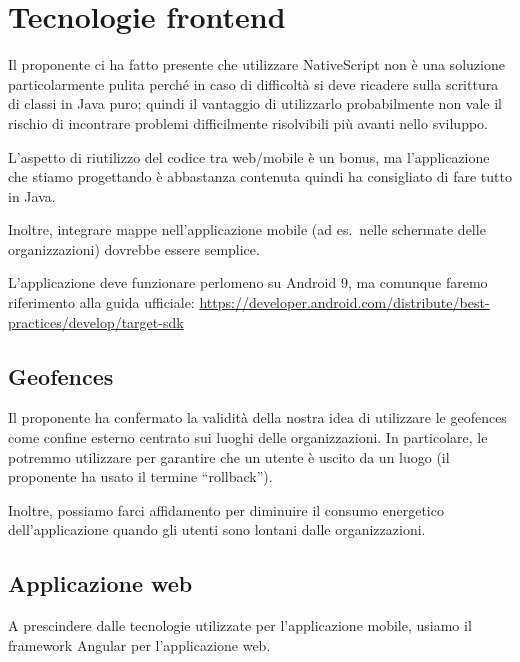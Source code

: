 \documentclass{article}
\begin{document}

\section{Tecnologie frontend}%
\label{sec:tecnologie_frontend}

Il proponente ci ha fatto presente che utilizzare NativeScript non è una soluzione particolarmente pulita perché in caso di difficoltà si deve ricadere sulla scrittura di classi in Java puro;
quindi il vantaggio di utilizzarlo probabilmente non vale il rischio di incontrare problemi difficilmente risolvibili più avanti nello sviluppo.

L'aspetto di riutilizzo del codice tra web/mobile è un bonus, ma l'applicazione che stiamo progettando è abbastanza contenuta quindi ha consigliato di fare tutto in Java.

Inoltre, integrare mappe nell'applicazione mobile (ad es.\ nelle schermate delle organizzazioni) dovrebbe essere semplice.

L'applicazione deve funzionare perlomeno su Android 9, ma comunque faremo riferimento alla guida ufficiale: \href{https://developer.android.com/distribute/best-practices/develop/target-sdk}{https://developer.android.com/distribute/best-practices/develop/target-sdk}

\subsection{Geofences}%
\label{sub:geofences}

Il proponente ha confermato la validità della nostra idea di utilizzare le geofences come confine esterno centrato sui luoghi delle organizzazioni.
In particolare, le potremmo utilizzare per garantire che un utente è uscito da un luogo (il proponente ha usato il termine ``rollback'').

Inoltre, possiamo farci affidamento per diminuire il consumo energetico dell'applicazione quando gli utenti sono lontani dalle organizzazioni.


\subsection{Applicazione web}%
\label{sub:applicazione_web}

A prescindere dalle tecnologie utilizzate per l'applicazione mobile, usiamo il framework Angular per l'applicazione web.
\end{document}
